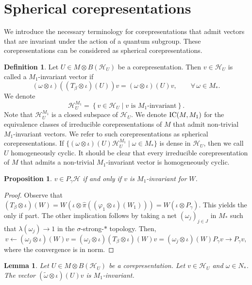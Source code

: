 \documentclass[11pt]{article}
\numberwithin{equation}{section}
\newtheorem{prop}[thm]{Proposition}
\newtheorem{lem}[thm]{Lemma}
\theoremstyle{definition}
\newtheorem{dfn}[thm]{Definition}
\newcommand{\cHil}{\mathcal{H}}
\newcommand{\ICMM}{\text{\rm IC}(M, M_1)}
\begin{document}
\section{Spherical corepresentations}\label{SectSphericalCoreps}
 We introduce the necessary terminology for corepresentations that admit vectors that are invariant under the action of a quantum subgroup. These corepresentations can be considered as spherical corepresentations.


\begin{dfn}\label{DfnMOneInv}
 Let $U \in M \otimes B(\cHil_U)$ be a corepresentation. Then  $v \in \cHil_U$   is called a $M_1$-invariant vector if
\[
 (\omega \otimes \iota)((T_\beta \otimes \iota)(U)) v = (\omega \otimes \iota)(U)v, \qquad \forall\, \omega\in M_\ast.
\]
 We denote
\[
\cHil_U^{M_1} = \left\{v \in \cHil_U \mid v \textrm{ is } M_1 \textrm{-invariant} \right\}.
\]
 Note that $\cHil_U^{M_1}$ is a closed subspace of $\cHil_U$. We denote
$
\ICMM
$
 for the equivalence classes of irreducible corepresentations of $M$ that admit non-trivial $M_1$-invariant vectors. We refer to such corepresentations as spherical corepresentations. If $\{ (\omega \otimes \iota)(U) \cHil_U^{M_1} \mid \omega \in M_\ast \}$ is dense in $\cHil_U$, then we call $U$ homogeneously cyclic. It should be clear that every irreducible corepresentation of $M$ that admits a non-trivial $M_1$-invariant vector is homogeneously cyclic.
 \end{dfn}

\begin{prop}\label{PropMOneInv}
$ v \in P_\gamma \cHil$ if and only if $v$ is $M_1$-invariant for $W$.
\end{prop}
\begin{proof}
Observe that $ (T_\beta \otimes \iota)(W) = W \left(\iota \otimes \hat{\pi}((\varphi_1 \otimes \iota)(W_1))\right) = W (\iota \otimes P_\gamma)$. This yields the only if part. The other implication follows by taking a  net $(\omega_j)_{j \in J}$ in $M_\ast$ such that $\lambda(\omega_j) \rightarrow 1$ in the $\sigma$-strong-$\ast$ topology. Then,
\[
v \leftarrow (\omega_j \otimes \iota)(W) v =  (\omega_j \otimes \iota)(T_\beta \otimes \iota)(W) v = (\omega_j \otimes \iota)( W)  P_\gamma v \rightarrow P_\gamma v,
\]
where the convergence is in norm.
\end{proof}


\begin{lem}
 Let $U \in M \otimes B(\cHil_U)$ be a corepresentation. Let $v \in \cHil_U$ and $\omega \in N_\ast$. The vector $(\tilde{\omega} \otimes \iota)(U) v$ is $M_1$-invariant.
\end{lem}
\end{document}
